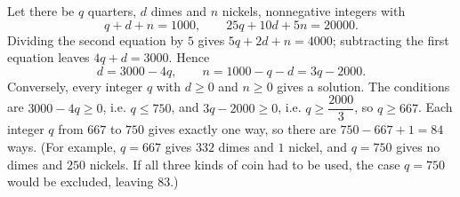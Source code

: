 Let there be $q$ quarters, $d$ dimes and $n$ nickels, nonnegative integers with
\[q+d+n=1000,\qquad 25q+10d+5n=20000.\]
Dividing the second equation by $5$ gives $5q+2d+n=4000$; subtracting the first equation leaves $4q+d=3000$. Hence
\[d=3000-4q,\qquad n=1000-q-d=3q-2000.\]
Conversely, every integer $q$ with $d\ge0$ and $n\ge0$ gives a solution. The conditions are $3000-4q\ge0$, i.e. $q\le750$, and $3q-2000\ge0$, i.e. $q\ge\dfrac{2000}{3}$, so $q\ge667$. Each integer $q$ from $667$ to $750$ gives exactly one way, so there are $750-667+1=\boxed{84}$ ways. (For example, $q=667$ gives $332$ dimes and $1$ nickel, and $q=750$ gives no dimes and $250$ nickels. If all three kinds of coin had to be used, the case $q=750$ would be excluded, leaving $83$.)
